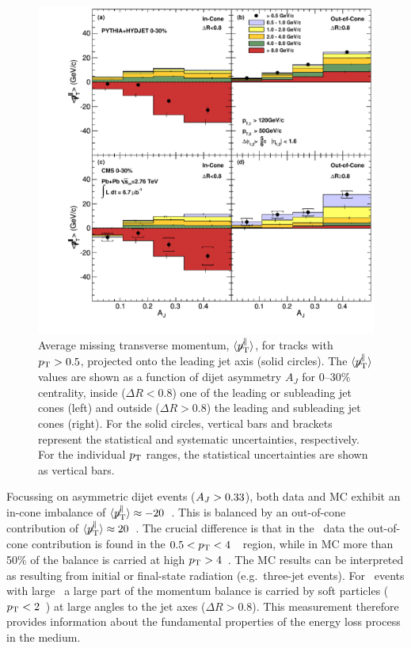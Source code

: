 \begin{figure}[!h]
\begin{center}
\includegraphics[width=0.98\mboxwidth]{jetfigures/missingPtParallel-Corrected-data-InConeOutConeDPhiCut_ntv6_2.pdf}
\caption{Average missing transverse momentum,
$\langle \displaystyle{\not} p_{\mathrm{T}}^{\parallel} \rangle$,
for tracks with $p_{\rm{T}} > 0.5$\GeVc, projected onto the leading jet axis (solid circles).
The $\langle \displaystyle{\not} p_{\mathrm{T}}^{\parallel} \rangle$ values are 
shown as a function of dijet asymmetry
$A_J$ for 0--30\% centrality, inside ($\Delta R < 0.8$) one of the leading or subleading jet cones (left) and
outside ($\Delta R > 0.8$) the leading and subleading jet cones (right).
For the solid circles, vertical bars and brackets represent
the statistical and systematic uncertainties, respectively.
For the individual $p_{\rm{T}}$ ranges, the statistical uncertainties are shown as vertical bars. }
\label{fig:GR:CMS_missingpT}
\end{center}
\end{figure}

Focussing on asymmetric dijet events ($A_J > 0.33$), both data and MC exhibit an
 in-cone imbalance of $\langle \displaystyle{\not} p_{\mathrm{T}}^{\parallel} \rangle \approx
-20$~\GeVc. This is balanced by an out-of-cone contribution of
$\langle \displaystyle{\not} p_{\mathrm{T}}^{\parallel} \rangle \approx 20$~\GeVc. The crucial 
difference is that in the \PbPb\ data the out-of-cone contribution is found in the $0.5 < p_{\rm{T}} < 4$~\GeVc\ region, 
while in MC more than 50\% of the balance is carried at high $p_{\rm{T}} > 4$~\GeVc. The MC 
results can be interpreted as resulting from initial or final-state radiation (e.g.\ three-jet events).
For \PbPb\ events with large \AJ\ a large part of the momentum balance is 
carried by soft particles ($p_{\rm{T}} < 2$~\GeVc) at large angles to the jet axes ($\Delta R > 0.8$). This measurement
therefore provides information about the fundamental properties of the energy loss process 
in the medium.

